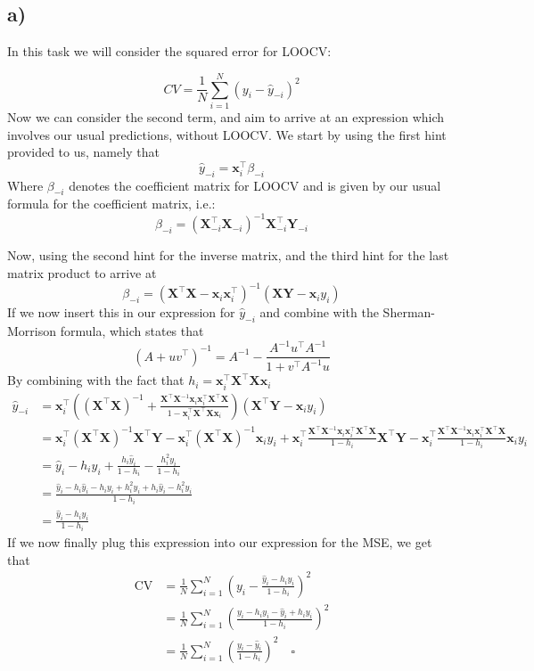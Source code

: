 \documentclass[
]{article}
\begin{document}
\hypertarget{a-3}{%
\subsection{a)}\label{a-3}}

In this task we will consider the squared error for LOOCV:

\[
CV=\frac{1}{N}\sum_{i=1}^N(y_i-\hat{y}_{-i})^2
\] Now we can consider the second term, and aim to arrive at an
expression which involves our usual predictions, without LOOCV. We start
by using the first hint provided to us, namely that \[
\hat{y}_{-i}=\textbf{x}_i^\top \beta_{-i}
\] Where \(\beta_{-i}\) denotes the coefficient matrix for LOOCV and is
given by our usual formula for the coefficient matrix, i.e.: \[
\beta_{-i}=(\textbf{X}_{-i}^\top \textbf{X}_{-i})^{-1}\textbf{X}_{-i}^\top\textbf{Y}_{-i}
\]

Now, using the second hint for the inverse matrix, and the third hint
for the last matrix product to arrive at \[
\beta_{-i}=(\textbf{X}^\top\textbf{X}-\textbf{x}_i\textbf{x}_i^\top)^{-1}(\textbf{X}\textbf{Y}-\textbf{x}_iy_i)
\] If we now insert this in our expression for \(\hat{y}_{-i}\) and
combine with the Sherman-Morrison formula, which states that \[
(A+uv^\top)^{-1}=A^{-1}-\frac{A^{-1}u^\top A^{-1}}{1+v^\top A^{-1}u}
\] By combining with the fact that
\(h_i = \textbf{x}_i^\top\textbf{X}^\top\textbf{X}\textbf{x}_i\) \[
\begin{aligned}
\hat{y}_{-i} &= \textbf{x}_i^\top\left( (\textbf{X}^\top\textbf{X})^{-1} + \frac{\textbf{X}^\top\textbf{X}^{-1}\textbf{x}_i\textbf{x}_i^\top\textbf{X}^\top\textbf{X}}{1-\textbf{x}_i^\top\textbf{X}^\top\textbf{X}\textbf{x}_i} \right)(\textbf{X}^\top\textbf{Y}-\textbf{x}_iy_i) \\
&= \textbf{x}_i^\top(\textbf{X}^\top\textbf{X})^{-1}\textbf{X}^\top \textbf{Y} - \textbf{x}_i^\top(\textbf{X}^\top\textbf{X})^{-1}\textbf{x}_iy_i + \textbf{x}_i^\top\frac{\textbf{X}^\top\textbf{X}^{-1}\textbf{x}_i\textbf{x}_i^\top\textbf{X}^\top\textbf{X}}{1-h_i}\textbf{X}^\top\textbf{Y}-\textbf{x}_i^\top\frac{\textbf{X}^\top\textbf{X}^{-1}\textbf{x}_i\textbf{x}_i^\top\textbf{X}^\top\textbf{X}}{1-h_i}\textbf{x}_iy_i \\
&= \hat{y}_i - h_iy_i + \frac{h_i\hat{y}_i}{1-h_i} - \frac{h_i^2 y_i}{1-h_i} \\
& = \frac{\hat{y}_i-h_i\hat{y}_i - h_iy_i+h_i^2y_i+h_i\hat{y}_i-h_i^2 y_i}{1-h_i} \\
& = \frac{\hat{y}_i-h_iy_i}{1-h_i}
\end{aligned}
\] If we now finally plug this expression into our expression for the
MSE, we get that \[
\begin{aligned}
\text{CV}&=\frac{1}{N}\sum_{i=1}^N\left( y_i-\frac{\hat{y}_i-h_iy_i}{1-h_i}\right)^2 \\
&= \frac{1}{N}\sum_{i=1}^N\left( \frac{y_i-h_iy_i -\hat{y}_i+h_iy_i}{1-h_i}\right)^2 \\
&= \frac{1}{N}\sum_{i=1}^N\left( \frac{y_i -\hat{y}_i}{1-h_i}\right)^2 \quad \square
\end{aligned}
\]
\end{document}
